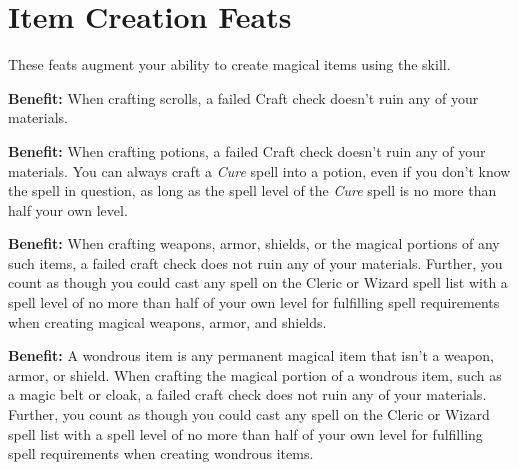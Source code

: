 \section{Item Creation Feats}

These feats augment your ability to create magical items using the  skill.


\textbf{Benefit:} When crafting scrolls, a failed Craft check doesn't ruin any of your materials.


\textbf{Benefit:} When crafting potions, a failed Craft check doesn't ruin any of your materials. You can always craft a \textit{Cure} spell into a potion, even if you don't know the spell in question, as long as the spell level of the \textit{Cure} spell is no more than half your own level.


\textbf{Benefit:} When crafting weapons, armor, shields, or the magical portions of any such items, a failed craft check does not ruin any of your materials. Further, you count as though you could cast any spell on the Cleric or Wizard spell list with a spell level of no more than half of your own level for fulfilling spell requirements when creating magical weapons, armor, and shields.


\textbf{Benefit:} A wondrous item is any permanent magical item that isn't a weapon, armor, or shield. When crafting the magical portion of a wondrous item, such as a magic belt or cloak, a failed craft check does not ruin any of your materials. Further, you count as though you could cast any spell on the Cleric or Wizard spell list with a spell level of no more than half of your own level for fulfilling spell requirements when creating wondrous items.
